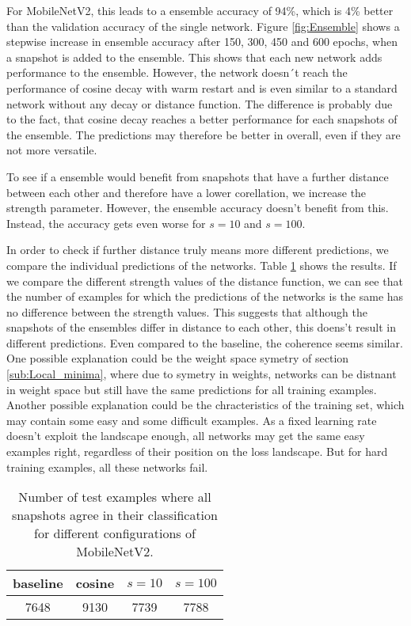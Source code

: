 For MobileNetV2, this leads to a ensemble accuracy of 94\%, which is 4\% better
than the validation accuracy of the single network. Figure \ref{fig:Ensemble}
shows a stepwise increase in ensemble accuracy after 150, 300, 450 and 600
epochs, when a snapshot is added to the ensemble. This shows that each new
network adds performance to the ensemble. However, the network doesn´t reach the
performance of cosine decay with warm restart and is even similar to a standard
network without any decay or distance function. The difference is probably due
to the fact, that cosine decay reaches a better performance for each snapshots
of the ensemble. The predictions may therefore be better in overall, even if
they are not more versatile.

To see if a ensemble would benefit from snapshots that have a further distance
between each other and therefore have a lower corellation, we increase
the strength parameter. However, the ensemble accuracy doesn't benefit from this.
Instead, the accuracy gets even worse for $s=10$ and $s=100$. 

In order to check if further distance truly means more different predictions, we
compare the individual predictions of the networks. Table \ref{tab:Ensemble}
shows the results. If we compare the different strength values of the distance
function, we can see that the number of examples for which the predictions of
the networks is the same has no difference between the strength values. This
suggests that although the snapshots of the ensembles differ in distance to each
other, this doens't result in different predictions. Even compared to the
baseline, the coherence seems similar. One possible explanation could be the
weight space symetry of section \ref{sub:Local_minima}, where due to symetry in
weights, networks can be distnant in weight space but still have the same
predictions for all training examples. Another possible explanation could be the
chracteristics of the training set, which may contain some easy and some
difficult examples. As a fixed learning rate doesn't exploit the landscape
enough, all networks may get the same easy examples right, regardless of their
position on the loss landscape. But for hard training examples, all these
networks fail.

\begin{table}[H]
    \centering
    \begin{tabular}{c|c|c|c}\label{tab:Ensemble}
        baseline & cosine & $s=10$ & $s=100$ \\
        \hline
        7648 & 9130 & 7739 & 7788 \\
    \end{tabular}
    \caption{Number of test examples where all snapshots agree in their classification for different configurations of MobileNetV2.}
\end{table}



